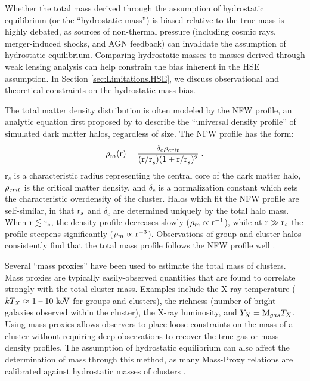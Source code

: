 Whether the total mass derived through the assumption of hydrostatic
equilibrium (or the ``hydrostatic mass'') is biased relative to the
true mass is highly debated, as sources of non-thermal pressure
(including cosmic rays, merger-induced shocks, and AGN feedback) can
invalidate the assumption of hydrostatic equilibrium. Comparing
hydrostatic masses to masses derived through weak lensing analysis can
help constrain the bias inherent in the HSE assumption. In Section
\ref{sec:Limitations.HSE}, we discuss observational and theoretical
constraints on the hydrostatic mass bias.

The total matter density distribution is often modeled by the NFW
profile, an analytic equation first proposed by \citet{Navarro1996}
to describe the ``universal density profile'' of simulated dark matter
halos, regardless of size. The NFW profile has the form:
\begin{equation}
\rho_m(\textrm{r}) = \frac{\delta_c\rho_{crit}}{(\textrm{r/r}_s)(1 + \textrm{r/r}_s)^2}\;.
\end{equation}
r$_s$ is a characteristic radius representing the central core of the
dark matter halo, $\rho_{crit}$ is the critical matter density, and
$\delta_c$ is a normalization constant which sets the characteristic
overdensity of the cluster. Halos which fit the NFW profile are
self-similar, in that $\textrm{r}_s$ and $\delta_c$ are determined
uniquely by the total halo mass. When $\textrm{r} \lesssim \textrm{r}_s$, the
density profile decreases slowly ($\rho_m \propto \textrm{r}^{-1}$),
while at $\textrm{r} \gg \textrm{r}_s$ the profile steepens significantly ($\rho_m
\propto \textrm{r}^{-3}$). Observations of group and cluster halos
consistently find that the total mass profile follows the NFW profile
well .

Several ``mass proxies'' have been used to estimate the total mass of
clusters. Mass proxies are typically easily-observed quantities that
are found to correlate strongly with the total cluster mass. Examples
include the X-ray temperature ($kT_X\approx1\;\textrm{--}\;10~\textrm{keV}{}$ for groups
and clusters), the richness (number of bright galaxies observed within
the cluster), the X-ray luminosity, and $Y_X = \textrm{M}_{gas}T_X$. Using
mass proxies allows observers to place loose constraints on the mass
of a cluster without requiring deep observations to recover the true
gas or mass density profiles. The assumption of hydrostatic
equilibrium can also affect the determination of mass through this
method, as many Mass-Proxy relations are calibrated against
hydrostatic masses of clusters .

